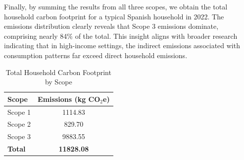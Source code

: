\documentclass[12pt,a4paper]{article}%
\begin{document}
\begin{table}[h]
\centering
\caption{Consumption-Based Emissions (Scope 3)}\label{tab:scope3}
\end{table}

Finally, by summing the results from all three scopes, we obtain the total household carbon footprint for a typical Spanish household in 2022. The emissions distribution clearly reveals that Scope 3 emissions dominate, comprising nearly 84\% of the total. This insight aligns with broader research indicating that in high-income settings, the indirect emissions associated with consumption patterns far exceed direct household emissions.

\begin{table}[h]
\centering
\caption{Total Household Carbon Footprint by Scope}\label{tab:total_emissions}
\begin{tabular}{|l|c|}
\hline
\textbf{Scope} & \textbf{Emissions (kg CO$_2$e)} \\
\hline
Scope 1 & 1114.83 \\
Scope 2 & 829.70 \\
Scope 3 & 9883.55 \\
\textbf{Total} & \textbf{11828.08} \\
\hline
\end{tabular}
\end{table}
\end{document}
